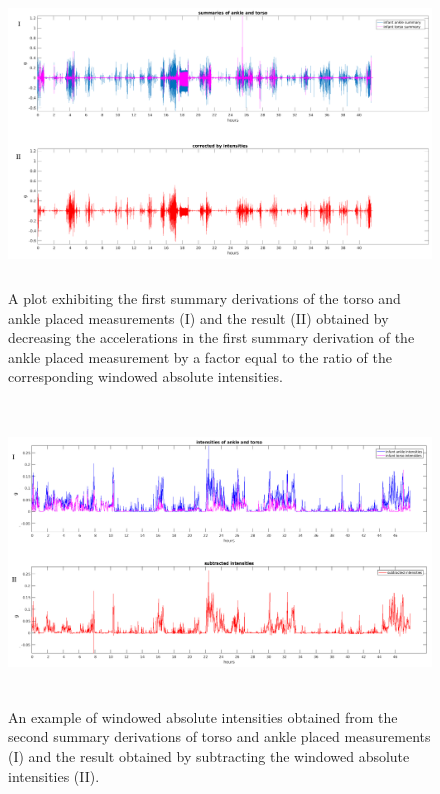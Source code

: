 \documentclass{article}
\begin{document}
{\begin{figure}[h!]
\end{figure}
\begin{figure}[h!]
\includegraphics[width=15cm, height=8cm]{correctingIntensities.png}
\caption{A plot exhibiting the first summary derivations of the torso and ankle placed measurements (I) and the result (II) obtained by decreasing the accelerations in the first summary derivation of the ankle placed measurement by a factor equal to the ratio of the corresponding windowed absolute intensities.}
\end{figure}
\newpage
\begin{figure}[h!]
\includegraphics[width=15cm, height=8cm]{bandpass_summary_example_B.png}
\caption{An example of windowed absolute intensities obtained from the second summary derivations of torso and ankle placed measurements (I) and the result obtained by subtracting the windowed absolute intensities (II).}
\end{figure}
\begin{figure}[h!]

\end{figure}}
\end{document}
